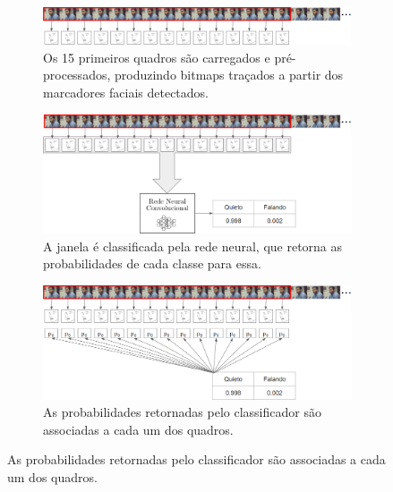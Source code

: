 \begin{figure}[ht]
    \centering
    \begin{subfigure}[b]{\textwidth}
        \includegraphics[width=\textwidth]{figures/alg_demo_2.png}
        \caption{Os 15 primeiros quadros são carregados e pré-processados, produzindo bitmaps traçados a partir dos marcadores faciais detectados.}
    \end{subfigure}
    \newline
    \newline
    \begin{subfigure}[b]{\textwidth}
        \includegraphics[width=\textwidth]{figures/alg_demo_4.png}
        \caption{A janela é classificada pela rede neural, que retorna as probabilidades de cada classe para essa.}
    \end{subfigure}
    \newline
    \newline
    \begin{subfigure}[b]{\textwidth}
        \includegraphics[width=\textwidth]{figures/alg_demo_5.png}
        \caption{As probabilidades retornadas pelo classificador são associadas a cada um dos quadros.}
    \end{subfigure}
    \newline
    \newline

\end{figure}
